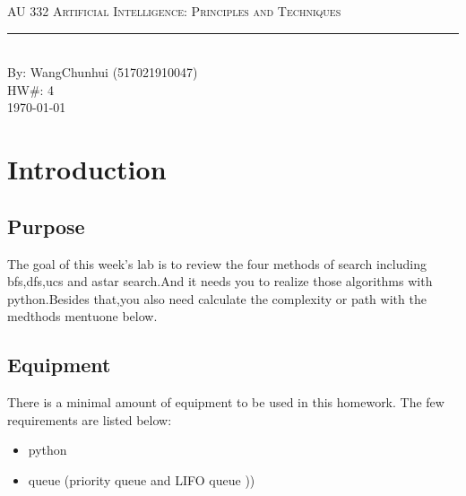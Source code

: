 \documentclass[aps,letterpaper,10pt]{revtex4}
\newcommand{\labtitle}{AU 332 Artificial Intelligence: Principles and Techniques}
\newcommand{\authorname}{WangChunhui (517021910047)}
\newcommand{\hw}{4}
\begin{document}


\begin{titlepage}
\begin{center}
{\Large \textsc{\labtitle} \\ \vspace{4pt}}
\rule[13pt]{\textwidth}{1pt} \\ \vspace{150pt}
{\large By: \authorname \\ \vspace{10pt}
HW\#: \hw \\ \vspace{10pt}
\today}
\end{center}
\end{titlepage}





\section{Introduction}
\subsection{Purpose}
\begin{comment}
This is a lab template which has a ton of different things which are useful in writing lab write-ups in the Computer Eningeering field.  This is demonstrating the comment block. Don't be overwhelmed, it may seem like a lot to take in at a time, but it's worth spending the time learning it.
\end{comment}
The goal of this week’s lab is to review the four methods of search including bfs,dfs,ucs and astar search.And it needs you to realize those algorithms with python.Besides that,you also need calculate the complexity or path with the medthods mentuone below.   

\vspace{3mm}


\subsection{Equipment}
There is a minimal amount of equipment to be used in this homework.  The few requirements are listed below:
	\begin{itemize}
		\item python
		\item queue (priority queue and LIFO queue ))
	\end{itemize}
\end{document}
